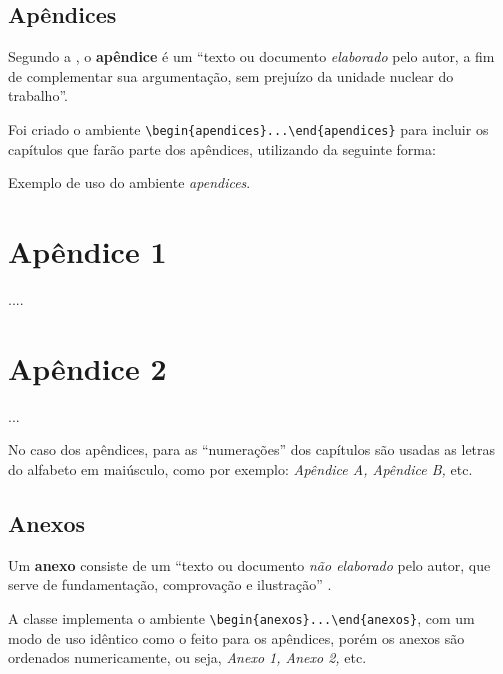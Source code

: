 \section{Apêndices}

Segundo a , o \textbf{apêndice} é um ``texto ou documento \emph{elaborado} pelo autor, a fim de complementar sua argumentação, sem prejuízo da unidade nuclear do trabalho''. 

Foi criado o ambiente \Verb+\begin{apendices}...\end{apendices}+ para incluir os capítulos que farão parte dos apêndices, utilizando da seguinte forma:

\begin{codigo}{}{Exemplo de uso do ambiente \emph{apendices}.}
\begin{apendices}

\chapter{Apêndice 1}
....
\chapter{Apêndice 2}
...

\end{apendices}
\end{codigo}

No caso dos apêndices, para as ``numerações'' dos capítulos são usadas as letras do alfabeto em maiúsculo, como por exemplo: \emph{Apêndice A, Apêndice B,} etc.

\section{Anexos}
Um \textbf{anexo} consiste de um ``texto ou documento \emph{não elaborado} pelo autor, que serve de fundamentação, comprovação e ilustração'' \cite[p. 2]{NBR14724:2011}.

A classe implementa o ambiente \Verb+\begin{anexos}...\end{anexos}+, com um modo de uso idêntico como o feito para os apêndices, porém os anexos são ordenados numericamente, ou seja, \emph{Anexo 1, Anexo 2,} etc.

